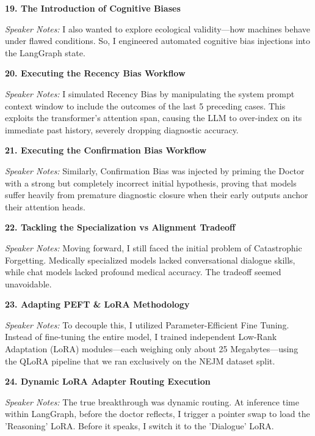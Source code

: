\documentclass[12pt]{article}
\begin{document}
\begin{description}
\item \textbf{19. The Introduction of Cognitive Biases}
\par\textit{Speaker Notes:} I also wanted to explore ecological validity—how machines behave under flawed conditions. So, I engineered automated cognitive bias injections into the LangGraph state. 

\item \textbf{20. Executing the Recency Bias Workflow}
\par\textit{Speaker Notes:} I simulated Recency Bias by manipulating the system prompt context window to include the outcomes of the last 5 preceding cases. This exploits the transformer's attention span, causing the LLM to over-index on its immediate past history, severely dropping diagnostic accuracy.

\item \textbf{21. Executing the Confirmation Bias Workflow}
\par\textit{Speaker Notes:} Similarly, Confirmation Bias was injected by priming the Doctor with a strong but completely incorrect initial hypothesis, proving that models suffer heavily from premature diagnostic closure when their early outputs anchor their attention heads.

\item \textbf{22. Tackling the Specialization vs Alignment Tradeoff}
\par\textit{Speaker Notes:} Moving forward, I still faced the initial problem of Catastrophic Forgetting. Medically specialized models lacked conversational dialogue skills, while chat models lacked profound medical accuracy. The tradeoff seemed unavoidable.

\item \textbf{23. Adapting PEFT \& LoRA Methodology}
\par\textit{Speaker Notes:} To decouple this, I utilized Parameter-Efficient Fine Tuning. Instead of fine-tuning the entire model, I trained independent Low-Rank Adaptation (LoRA) modules—each weighing only about 25 Megabytes—using the QLoRA pipeline that we ran exclusively on the NEJM dataset split.

\item \textbf{24. Dynamic LoRA Adapter Routing Execution}
\par\textit{Speaker Notes:} The true breakthrough was dynamic routing. At inference time within LangGraph, before the doctor reflects, I trigger a pointer swap to load the 'Reasoning' LoRA. Before it speaks, I switch it to the 'Dialogue' LoRA. 


\end{description}
\end{document}

